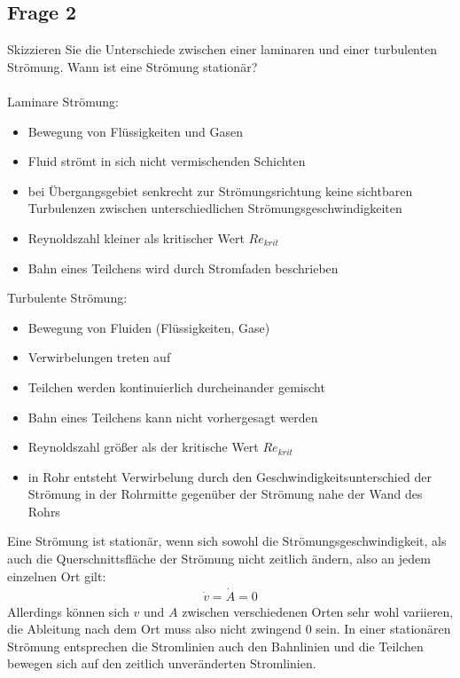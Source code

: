 \documentclass[a4paper,10pt]{scrartcl}
\begin{document}
		\subsection{Frage 2}
			Skizzieren Sie die Unterschiede zwischen einer laminaren und einer turbulenten Strömung.
			Wann ist eine Strömung stationär?\\
			\\
			Laminare Strömung:
			\begin{itemize}
				\item Bewegung von Flüssigkeiten und Gasen
				\item Fluid strömt in sich nicht vermischenden Schichten
				\item bei Übergangsgebiet senkrecht zur Strömungsrichtung keine sichtbaren Turbulenzen zwischen unterschiedlichen Strömungsgeschwindigkeiten
				\item Reynoldszahl kleiner als kritischer Wert \(Re_{krit}\)
				\item Bahn eines Teilchens wird durch \glqq Stromfaden\grqq{} beschrieben
			\end{itemize}
			
			Turbulente Strömung:
			\begin{itemize}
				\item Bewegung von Fluiden (Flüssigkeiten, Gase)
				\item Verwirbelungen treten auf
				\item Teilchen werden kontinuierlich durcheinander gemischt
				\item Bahn eines Teilchens kann nicht vorhergesagt werden
				\item Reynoldszahl größer als der kritische Wert \(Re_{krit}\)
				\item in Rohr entsteht Verwirbelung durch den Geschwindigkeitsunterschied der Strömung in der Rohrmitte gegenüber der Strömung nahe der Wand des Rohrs
			\end{itemize}
			
			Eine Strömung ist stationär, wenn sich sowohl die Strömungsgeschwindigkeit, als auch die Querschnittsfläche der Strömung nicht zeitlich ändern, also an jedem einzelnen Ort gilt:
			\begin{align*}
			\dot v=\dot A=0
			\end{align*}
			Allerdings können sich \(v\) und \(A\) zwischen verschiedenen Orten sehr wohl variieren, die Ableitung nach dem Ort muss also nicht zwingend 0 sein. In einer stationären Strömung entsprechen die Stromlinien auch den Bahnlinien und die Teilchen bewegen sich auf den zeitlich unveränderten Stromlinien.
			
\end{document}
